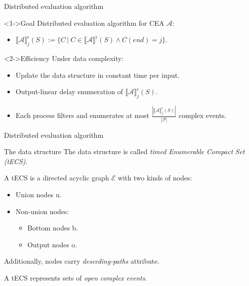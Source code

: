 \documentclass[xcolor=pdftex,dvipsnames,table]{beamer}
\begin{document}
\begin{frame}{Distributed evaluation algorithm}
  \begin{block}<1->{Goal}
    Distributed evaluation algorithm for CEA $\mathcal{A}$:
   \begin{itemize}
     \item ${\llbracket \mathcal{A} \rrbracket}^{\epsilon}_{j}(S) := \{ C \ | \ C \in {\llbracket \mathcal{A} \rrbracket}^{\epsilon}(S) \land C(end) = j \}$.
   \end{itemize}
  \end{block}

  \begin{block}<2->{Efficiency}
     Under data complexity:
      \begin{itemize}
        \item Update the data structure in constant time per input.
        \item<3-> Output-linear delay enumeration of ${\llbracket \mathcal{A} \rrbracket}^{\epsilon}_{j}(S)$.
        \pause
        \item<4-> Each process filters and enumerates at most $\frac{|{\llbracket \mathcal{A} \rrbracket}^{\epsilon}_{j}(S)|}{|\mathcal{P}|}$ complex events.
      \end{itemize}
  \end{block}
\end{frame}


\begin{frame}{Distributed evaluation algorithm}
  \begin{block}{The data structure}
    The data structure is called \emph{timed Enumerable Compact Set (tECS)}.

    A tECS is a directed acyclic graph $\mathcal{E}$ with two kinds of nodes:

   \begin{itemize}
     \item Union nodes \textrm{u}.
     \item Non-union nodes:
      \begin{itemize}
        \item Bottom nodes \textrm{b}.
        \item Output nodes \textrm{o}.
      \end{itemize}
   \end{itemize}

   Additionally, nodes carry \emph{desceding-paths} attribute.

   A tECS represents sets of \emph{open complex events}.
  \end{block}
\end{frame}
\end{document}
